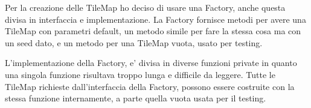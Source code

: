 \documentclass[a4paper,12pt]{report}
\begin{document}
    \par
    \par Per la creazione delle TileMap ho deciso di usare una Factory,
    anche questa divisa in interfaccia e implementazione.
    La Factory fornisce metodi per avere una TileMap con parametri default,
    un metodo simile per fare la stessa cosa ma con un seed dato,
    e un metodo per una TileMap vuota, usato per testing.

    \par L'implementazione della Factory, e' divisa in diverse funzioni private
    in quanto una singola funzione risultava troppo lunga e difficile da leggere.
    Tutte le TileMap richieste dall'interfaccia della Factory, possono essere costruite con la stessa funzione internamente,
    a parte quella vuota usata per il testing.
\end{document}
